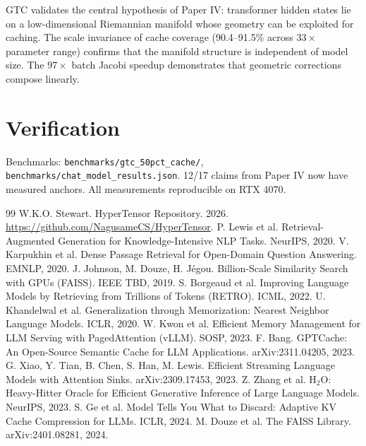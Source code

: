 \documentclass[11pt]{article}
\begin{document}
GTC validates the central hypothesis of Paper IV: transformer hidden
states lie on a low-dimensional Riemannian manifold whose geometry can
be exploited for caching. The scale invariance of cache coverage
(90.4--91.5\% across $33\times$ parameter range) confirms that the
manifold structure is independent of model size. The $97\times$ batch
Jacobi speedup demonstrates that geometric corrections compose linearly.

\section{Verification}

Benchmarks: \texttt{benchmarks/gtc\_50pct\_cache/},
\texttt{benchmarks/chat\_model\_results.json}. 12/17 claims from Paper IV
now have measured anchors. All measurements reproducible on RTX 4070.

\clearpage
\begin{thebibliography}{99}
 W.K.O. Stewart. HyperTensor Repository. 2026. \url{https://github.com/NagusameCS/HyperTensor}.
 P. Lewis et al. Retrieval-Augmented Generation for Knowledge-Intensive NLP Tasks. NeurIPS, 2020.
 V. Karpukhin et al. Dense Passage Retrieval for Open-Domain Question Answering. EMNLP, 2020.
 J. Johnson, M. Douze, H. J{\'e}gou. Billion-Scale Similarity Search with GPUs (FAISS). IEEE TBD, 2019.
 S. Borgeaud et al. Improving Language Models by Retrieving from Trillions of Tokens (RETRO). ICML, 2022.
 U. Khandelwal et al. Generalization through Memorization: Nearest Neighbor Language Models. ICLR, 2020.
 W. Kwon et al. Efficient Memory Management for LLM Serving with PagedAttention (vLLM). SOSP, 2023.
 F. Bang. GPTCache: An Open-Source Semantic Cache for LLM Applications. arXiv:2311.04205, 2023.
 G. Xiao, Y. Tian, B. Chen, S. Han, M. Lewis. Efficient Streaming Language Models with Attention Sinks. arXiv:2309.17453, 2023.
 Z. Zhang et al. H$_2$O: Heavy-Hitter Oracle for Efficient Generative Inference of Large Language Models. NeurIPS, 2023.
 S. Ge et al. Model Tells You What to Discard: Adaptive KV Cache Compression for LLMs. ICLR, 2024.
 M. Douze et al. The FAISS Library. arXiv:2401.08281, 2024.
\end{thebibliography}

\newpage


\end{document}
